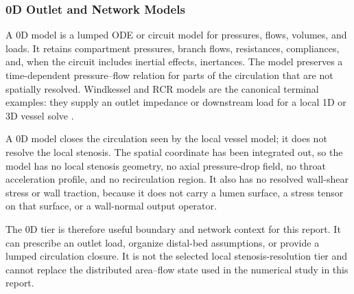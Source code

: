 \subsubsection{0D Outlet and Network Models}
\label{subsubsec:0d-models}

A 0D model is a lumped ODE or circuit model for pressures, flows, volumes, and
loads. It retains compartment pressures, branch flows, resistances,
compliances, and, when the circuit includes inertial effects, inertances. The
model preserves a time-dependent pressure--flow relation for parts of the
circulation that are not spatially resolved. Windkessel and RCR models are the
canonical terminal examples: they supply an outlet impedance or downstream load
for a local 1D or 3D vessel solve
\cite{ShiEtAl2011BloodFlowModelReview,KopplHelmig2023DimensionReducedModeling}.

A 0D model closes the circulation seen by the local vessel model; it does not
resolve the local stenosis. The spatial coordinate has been integrated out, so
the model has no local stenosis geometry, no axial pressure-drop field, no
throat acceleration profile, and no recirculation region. It also has no
resolved wall-shear stress or wall traction, because it does not carry a lumen
surface, a stress tensor on that surface, or a wall-normal output operator.

The 0D tier is therefore useful boundary and network context for this report. It
can prescribe an outlet load, organize distal-bed assumptions, or provide a
lumped circulation closure. It is not the selected local stenosis-resolution
tier and cannot replace the distributed area--flow state used in the numerical
study in this report.
